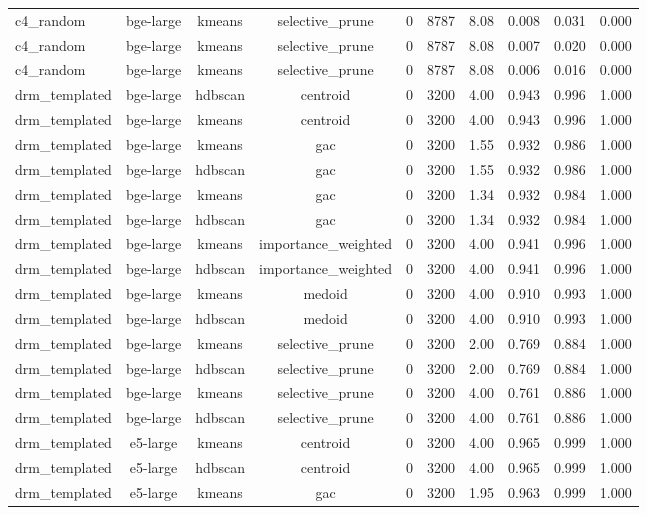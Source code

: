 \begin{longtable}{lccccccccc}
c4\_random & bge-large & kmeans & selective\_prune & 0 & 8787 & 8.08 & 0.008 & 0.031 & 0.000 \\
c4\_random & bge-large & kmeans & selective\_prune & 0 & 8787 & 8.08 & 0.007 & 0.020 & 0.000 \\
c4\_random & bge-large & kmeans & selective\_prune & 0 & 8787 & 8.08 & 0.006 & 0.016 & 0.000 \\
drm\_templated & bge-large & hdbscan & centroid & 0 & 3200 & 4.00 & 0.943 & 0.996 & 1.000 \\
drm\_templated & bge-large & kmeans & centroid & 0 & 3200 & 4.00 & 0.943 & 0.996 & 1.000 \\
drm\_templated & bge-large & kmeans & gac & 0 & 3200 & 1.55 & 0.932 & 0.986 & 1.000 \\
drm\_templated & bge-large & hdbscan & gac & 0 & 3200 & 1.55 & 0.932 & 0.986 & 1.000 \\
drm\_templated & bge-large & kmeans & gac & 0 & 3200 & 1.34 & 0.932 & 0.984 & 1.000 \\
drm\_templated & bge-large & hdbscan & gac & 0 & 3200 & 1.34 & 0.932 & 0.984 & 1.000 \\
drm\_templated & bge-large & kmeans & importance\_weighted & 0 & 3200 & 4.00 & 0.941 & 0.996 & 1.000 \\
drm\_templated & bge-large & hdbscan & importance\_weighted & 0 & 3200 & 4.00 & 0.941 & 0.996 & 1.000 \\
drm\_templated & bge-large & kmeans & medoid & 0 & 3200 & 4.00 & 0.910 & 0.993 & 1.000 \\
drm\_templated & bge-large & hdbscan & medoid & 0 & 3200 & 4.00 & 0.910 & 0.993 & 1.000 \\
drm\_templated & bge-large & kmeans & selective\_prune & 0 & 3200 & 2.00 & 0.769 & 0.884 & 1.000 \\
drm\_templated & bge-large & hdbscan & selective\_prune & 0 & 3200 & 2.00 & 0.769 & 0.884 & 1.000 \\
drm\_templated & bge-large & kmeans & selective\_prune & 0 & 3200 & 4.00 & 0.761 & 0.886 & 1.000 \\
drm\_templated & bge-large & hdbscan & selective\_prune & 0 & 3200 & 4.00 & 0.761 & 0.886 & 1.000 \\
drm\_templated & e5-large & kmeans & centroid & 0 & 3200 & 4.00 & 0.965 & 0.999 & 1.000 \\
drm\_templated & e5-large & hdbscan & centroid & 0 & 3200 & 4.00 & 0.965 & 0.999 & 1.000 \\
drm\_templated & e5-large & kmeans & gac & 0 & 3200 & 1.95 & 0.963 & 0.999 & 1.000 \\

\end{longtable}
